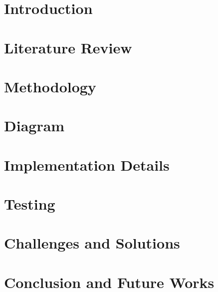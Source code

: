 \documentclass[12pt, a4paper]{report}
\begin{document}
\renewcommand{\contentsname}{Table of Contents}
\tableofcontents

\clearpage
{}
\listoffigures

\clearpage
{}
\listoftables
\clearpage


\clearpage
{}
\setcounter{page}{1}

\clearpage
\chapter{Introduction}


\clearpage
\chapter{Literature Review} \label{ch: reviews}


\clearpage
\chapter{Methodology} \label{ch: methodology}


\clearpage
\chapter{Diagram} \label{ch: diagram}



\clearpage
\chapter{Implementation Details} \label{ch: implementation}


\clearpage
\chapter{Testing} \label{ch: testing}


\clearpage
\chapter{Challenges and Solutions} \label{ch: challanges}



\chapter{Conclusion and Future Works} \label{ch: conclusion}



\clearpage
\renewcommand\bibname{References}


\nocite{*}
\end{document}
